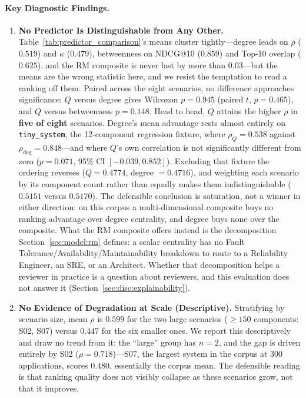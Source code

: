 \paragraph{Key Diagnostic Findings.}
\begin{enumerate}
    \item \textbf{No Predictor Is Distinguishable from Any Other.} Table~\ref{tab:predictor_comparison}'s means cluster tightly---degree leads on $\rho$ ($0.519$) and $\kappa$ ($0.479$), betweenness on NDCG@10 ($0.859$) and Top-10 overlap ($0.625$), and the RM composite is never last by more than $0.03$---but the means are the wrong statistic here, and we resist the temptation to read a ranking off them. Paired across the eight scenarios, no difference approaches significance: $Q$ versus degree gives Wilcoxon $p = 0.945$ (paired $t$, $p = 0.465$), and $Q$ versus betweenness $p = 0.148$. Head to head, $Q$ attains the higher $\rho$ in \textbf{five of eight} scenarios. Degree's mean advantage rests almost entirely on \texttt{tiny\_system}, the 12-component regression fixture, where $\rho_Q = 0.538$ against $\rho_{\text{deg}} = 0.848$---and where $Q$'s own correlation is not significantly different from zero ($p = 0.071$, 95\% CI $[-0.039, 0.852]$). Excluding that fixture the ordering reverses ($Q = 0.4774$, degree $= 0.4716$), and weighting each scenario by its component count rather than equally makes them indistinguishable ($0.5151$ versus $0.5170$). The defensible conclusion is saturation, not a winner in either direction: on this corpus a multi-dimensional composite buys no ranking advantage over degree centrality, and degree buys none over the composite. What the RM composite offers instead is the decomposition Section~\ref{sec:model:rm} defines: a scalar centrality has no Fault Tolerance/Availability/Maintainability breakdown to route to a Reliability Engineer, an SRE, or an Architect. Whether that decomposition helps a reviewer in practice is a question about reviewers, and this evaluation does not answer it (Section~\ref{sec:disc:explainability}).
    \item \textbf{No Evidence of Degradation at Scale (Descriptive).} Stratifying by scenario size, mean $\rho$ is $0.599$ for the two large scenarios ($\ge 150$ components: S02, S07) versus $0.447$ for the six smaller ones. We report this descriptively and draw no trend from it: the ``large'' group has $n=2$, and the gap is driven entirely by S02 ($\rho = 0.718$)---S07, the largest system in the corpus at 300 applications, scores $0.480$, essentially the corpus mean. The defensible reading is that ranking quality does not visibly collapse as these scenarios grow, not that it improves.

\end{enumerate}
